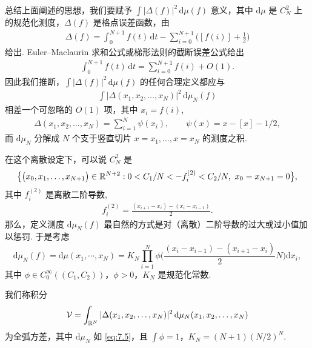 总结上面阐述的思想，我们要赋予 $\int |\Delta(f)|^2\,\mathrm{d}\mu(f)$ 意义，其中 $\mathrm{d}\mu$ 是 $C_N^2$ 上的规范化测度，$\Delta(f)$ 是格点误差函数，由
\begin{align*}
  \Delta(f)=\int_{0}^{N+1}f(t)\,\mathrm{d}t-\sum_{i=0}^{N+1}\Big([f(i)]+\frac{1}{2}\Big)
\end{align*}
给出. Euler--Maclaurin 求和公式或梯形法则的截断误差公式给出
\begin{align*}
  \int_{0}^{N+1}f(t)\,\mathrm{d}t=\sum_{i=0}^{N+1}f(i)+O(1).
\end{align*}
因此我们推断，$\int|\Delta(f)|^{2}\,\mathrm{d}\mu(f)$ 的任何合理定义都应与
\begin{align*}
  \int|\Delta(x_{1},x_{2},\ldots,x_{N})|^{2}\,\mathrm{d}\mu_{N}(f)
\end{align*}
相差一个可忽略的 $O(1)$ 项，其中 $x_{i}=f(i)$,
\begin{align*}
  \Delta(x_{1},x_{2},\ldots,x_{N})=\sum_{i=1}^{N}\psi(x_{i}),\qquad
  \psi(x)=x-[x]-1/2,
\end{align*}
而 $\mathrm{d}\mu_{N}$ 分解成 $N$ 个支于竖直切片 $x = x_{1}, \ldots, x = x_{N}$ 的测度之积.

在这个离散设定下，可以说 $C_{N}^{2}$ 是
\begin{align*}
  \big\{\big(x_{0},x_{1},\ldots,x_{N+1}\big)\in\mathbb{R}^{N+2}:
  0<C_{1}/N<-f_{i}^{(2)}<C_{2}/N,\ x_{0}=x_{N+1}=0\big\},
\end{align*}
其中 $f_{i}^{(2)}$ 是离散二阶导数,
\begin{align*}
  f_{i}^{(2)}=\frac{\left(x_{i+1}-x_{i}\right)-\left(x_{i}-x_{i-1}\right)}{2}.
\end{align*}
那么，定义测度 $\mathrm{d}\mu_{N}(f)$ 最自然的方式是对（离散）二阶导数的过大或过小值加以惩罚. 于是考虑
\begin{equation}\label{eq:7.5}
  \mathrm{d}\mu_{N}(f)=\mathrm{d}\mu(x_{1},\cdots,x_{N})
  =K_{N}\prod_{i=1}^{N}\phi\Big(\frac{(x_{i}-x_{i-1})-(x_{i+1}-x_{i})}{2}N\Big)\mathrm{d}x_{i},
\end{equation}
其中 $\phi \in C_0^\infty((C_1, C_2))$，$\phi > 0$，$K_N$ 是规范化常数.

\begin{definition}\label{def:7.9}
我们称积分
\begin{align*}
  \mathcal{V}=\int_{\mathbb{R}^{N}}|\Delta(x_{1},x_{2},\ldots,x_{N})|^{2}\,\mathrm{d}\mu_{N}(x_{1},x_{2},\ldots,x_{N})
\end{align*}
为全弧方差，其中 $\mathrm{d}\mu_{N}$ 如 \eqref{eq:7.5}，且 $\int\phi = 1$，$K_{N} = (N+1)(N/2)^{N}$.
\end{definition}

